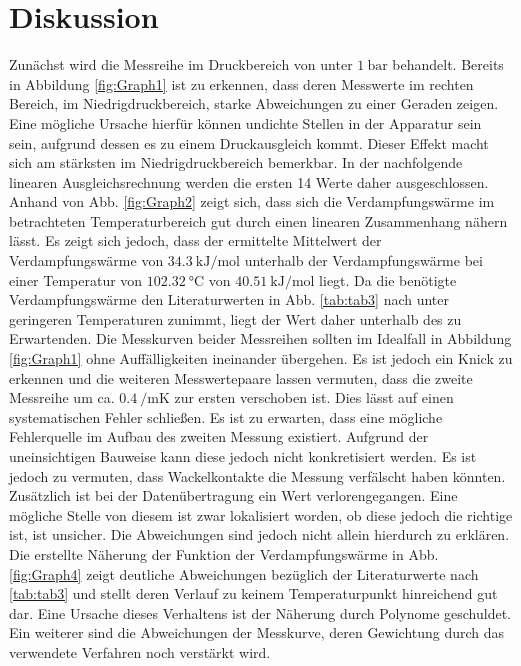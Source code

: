 
\section{Diskussion}
\label{sec:Diskussion}
Zunächst wird die Messreihe im Druckbereich von unter $\SI{1}{\bar}$
 behandelt. Bereits in Abbildung \ref{fig:Graph1} ist zu erkennen, dass deren Messwerte im
  rechten Bereich, im Niedrigdruckbereich, starke Abweichungen zu einer Geraden zeigen. Eine mögliche Ursache hierfür können
  undichte Stellen in der Apparatur sein sein, aufgrund dessen es zu einem
   Druckausgleich kommt. Dieser Effekt macht sich am stärksten im
   Niedrigdruckbereich bemerkbar. In der nachfolgende linearen Ausgleichsrechnung
    werden die ersten 14 Werte daher ausgeschlossen. Anhand von Abb.
     \ref{fig:Graph2} zeigt sich, dass sich die Verdampfungswärme im betrachteten
      Temperaturbereich gut durch einen linearen Zusammenhang nähern lässt. Es zeigt sich jedoch, dass der
      ermittelte Mittelwert der Verdampfungswärme von $\SI{34.3}{\kilo\joule\per\mol}$ unterhalb der Verdampfungswärme bei einer
       Temperatur von $\SI{102.32}{\degreeCelsius}$ von $\SI{40.51}{\kilo\joule\per\mol}$ \cite{WasserTab} liegt. Da die benötigte
       Verdampfungswärme den Literaturwerten in Abb. \ref{tab:tab3} nach  unter geringeren Temperaturen zunimmt, liegt der Wert
        daher unterhalb des zu Erwartenden. Die Messkurven beider
          Messreihen sollten im Idealfall in Abbildung \ref{fig:Graph1} ohne Auffälligkeiten ineinander übergehen.
           Es ist jedoch ein Knick zu erkennen und die weiteren Messwertepaare lassen vermuten, dass die zweite Messreihe um ca.
           $\SI{0.4}{\per\milli\kelvin}$ zur ersten verschoben ist. Dies lässt auf einen systematischen Fehler schließen. Es ist zu erwarten, dass eine mögliche
              Fehlerquelle im Aufbau des zweiten Messung existiert. Aufgrund der
               uneinsichtigen Bauweise kann diese jedoch nicht konkretisiert werden. Es ist jedoch zu vermuten, dass Wackelkontakte die Messung verfälscht haben könnten.
               Zusätzlich ist bei der Datenübertragung ein Wert verlorengegangen.
               Eine mögliche Stelle  von diesem ist zwar lokalisiert worden, ob diese jedoch die richtige ist, ist unsicher.
                Die Abweichungen sind jedoch nicht allein hierdurch zu erklären.
                 Die erstellte Näherung der Funktion der Verdampfungswärme in Abb. \ref{fig:Graph4} zeigt
                  deutliche Abweichungen bezüglich der Literaturwerte nach \ref{tab:tab3} und stellt deren
                   Verlauf zu keinem Temperaturpunkt hinreichend gut dar. Eine
                   Ursache dieses Verhaltens ist der Näherung durch Polynome geschuldet.
                    Ein weiterer sind die Abweichungen der Messkurve, deren
                     Gewichtung durch das verwendete Verfahren noch verstärkt wird.
